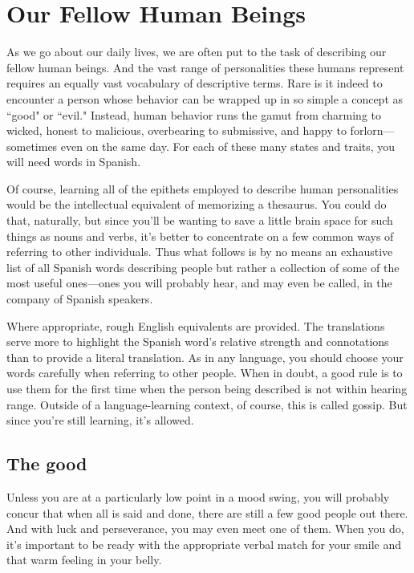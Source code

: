\chapter{Our Fellow Human Beings}

As we go about our daily lives, we are often put to the task of
describing our fellow human beings. And the vast range of personalities these humans represent requires an equally vast vocabulary of descriptive terms. Rare is it indeed to encounter a person whose behavior
can be wrapped up in so simple a concept as ``good" or ``evil." Instead,
human behavior runs the gamut from charming to wicked, honest to
malicious, overbearing to submissive, and happy to forlorn---sometimes even on the same day. For each of these many states and traits,
you will need words in Spanish.

Of course, learning all of the epithets employed to describe human personalities would be the intellectual equivalent of memorizing
a thesaurus. You could do that, naturally, but since you'll be wanting
to save a little brain space for such things as nouns and verbs, it's better to concentrate on a few common ways of referring to other individuals. Thus what follows is by no means an exhaustive list of all Spanish words describing people but rather a collection of some of the most
useful ones---ones you will probably hear, and may even be called, in
the company of Spanish speakers.

Where appropriate, rough English equivalents are provided.
The translations serve more to highlight the Spanish word's relative
strength and connotations than to provide a literal translation. As in
any language, you should choose your words carefully when referring
to other people. When in doubt, a good rule is to use them for the first
time when the person being described is not within hearing range.
Outside of a language-learning context, of course, this is called gossip.
But since you're still learning, it's allowed.

\section{The good}

Unless you are at a particularly low point in a mood swing,
you will probably concur that when all is said and done, there are still
a few good people out there. And with luck and perseverance, you may
even meet one of them. When you do, it's important to be ready with
the appropriate verbal match for your smile and that warm feeling in
your belly.


